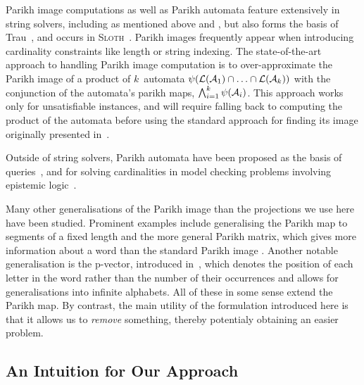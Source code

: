 Parikh image computations as well as Parikh automata feature extensively in
string solvers, including as mentioned above \Ostrich{} and \OstrichPlus{}
\cite{ostrich,ostrich-plus}, but also forms the basis of Trau~\cite{trau-pldi},
and occurs in \textsc{Sloth}~\cite{sloth}. Parikh images frequently appear when
introducing cardinality constraints like length or string indexing. The
state-of-the-art approach to handling Parikh image computation is to
over-approximate the Parikh image of a product of $k$~automata
$\operatorname{\psi}(\operatorname{\mathcal{L}}(\mathcal{A}_1) \cap \ldots \cap \operatorname{\mathcal{L}}(\mathcal{A}_k))$
with the conjunction of the automata's parikh maps, $\bigwedge_{i=1}^{k}
\operatorname{\psi}(\mathcal{A}_i)$. This approach works only for unsatisfiable instances,
and will require falling back to computing the product of the automata before
using the standard approach for finding its image originally presented
in~\cite{generate-parikh-image}.

Outside of string solvers, Parikh automata have been proposed as the basis of
queries~\cite{graph-queries}, and for solving cardinalities in model checking
problems involving epistemic logic~\cite{epistemic-logic}.

Many other generalisations of the Parikh image than the projections we use here
have been studied. Prominent examples include generalising the Parikh map to
segments of a fixed length \cite{KARHUMAKI1980155} and the more general Parikh
matrix, which gives more information about a word than the standard Parikh image
\cite{parikh-matrix}. Another notable generalisation is the p-vector, introduced
in~\cite{infinite-words}, which denotes the position of each letter in the word
rather than the number of their occurrences and allows for generalisations into
infinite alphabets. All of these in some sense extend the Parikh map. By
contrast, the main utility of the formulation introduced here is that it allows
us to \emph{remove} something, thereby potentialy obtaining an easier problem.

\subsection{An Intuition for Our Approach}\label{sec:intuition}

